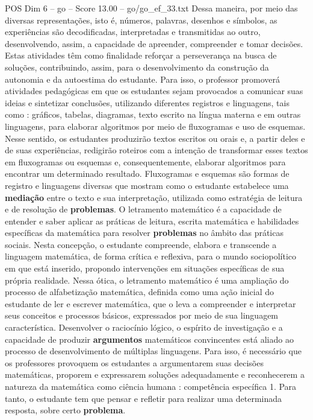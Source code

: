 \begin{textsample}{POS Dim 6 – go – Score 13.00 – go/go\_ef\_33.txt}
Dessa maneira, por meio das diversas representações, isto é, números, palavras, desenhos e símbolos, as experiências são decodificadas, interpretadas e transmitidas ao outro, desenvolvendo, assim, a capacidade de apreender, compreender e tomar decisões.
Estas atividades têm como finalidade reforçar a perseverança na busca de soluções, contribuindo, assim, para o desenvolvimento da construção da autonomia e da autoestima do estudante.
Para isso, o professor promoverá atividades pedagógicas em que os estudantes sejam provocados a comunicar suas ideias e sintetizar conclusões, utilizando diferentes registros e linguagens, tais como : gráficos, tabelas, diagramas, texto escrito na língua materna e em outras linguagens, para elaborar algoritmos por meio de fluxogramas e uso de esquemas.
Nesse sentido, os estudantes produzirão textos escritos ou orais e, a partir deles e de suas experiências, redigirão roteiros com a intenção de transformar esses textos em fluxogramas ou esquemas e, consequentemente, elaborar algoritmos para encontrar um determinado resultado.
Fluxogramas e esquemas são formas de registro e linguagens diversas que mostram como o estudante estabelece uma \textbf{mediação} entre o texto e sua interpretação, utilizada como estratégia de leitura e de resolução de \textbf{problemas}.
O letramento matemático é a capacidade de entender e saber aplicar as práticas de leitura, escrita matemática e habilidades específicas da matemática para resolver \textbf{problemas} no âmbito das práticas sociais.
Nesta concepção, o estudante compreende, elabora e transcende a linguagem matemática, de forma crítica e reflexiva, para o mundo sociopolítico em que está inserido, propondo intervenções em situações específicas de sua própria realidade.
Nessa ótica, o letramento matemático é uma ampliação do processo de alfabetização matemática, definida como uma ação inicial do estudante de ler e escrever matemática, que o leva a compreender e interpretar seus conceitos e processos básicos, expressados por meio de sua linguagem característica.
Desenvolver o raciocínio lógico, o espírito de investigação e a capacidade de produzir \textbf{argumentos} matemáticos convincentes está aliado ao processo de desenvolvimento de múltiplas linguagens.
Para isso, é necessário que os professores provoquem os estudantes a argumentarem suas decisões matemáticas, proporem e expressarem soluções adequadamente e reconhecerem a natureza da matemática como ciência humana : competência específica 1.
Para tanto, o estudante tem que pensar e refletir para realizar uma determinada resposta, sobre certo \textbf{problema}.

\end{textsample}
